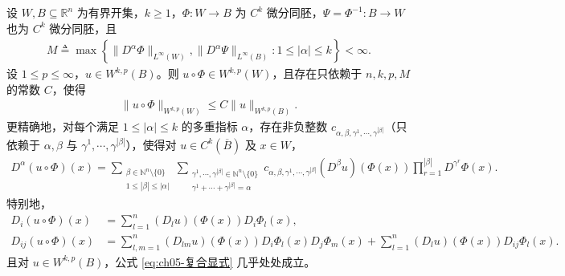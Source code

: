 \documentclass[../../main.tex]{subfiles}
\begin{document}
\begin{proposition}[$C^{k}$微分同胚下的复合函数的弱导数]\label{proposition:ch05-复合Wkp}
设 $W,B\subseteq\mathbb{R}^{n}$ 为有界开集，$k\geqslant1$，$\Phi:W\to B$ 为 $C^{k}$ 微分同胚，$\Psi=\Phi^{-1}:B\to W$ 也为 $C^{k}$ 微分同胚，且
\begin{align*}
M\triangleq\max\left\{\|D^{\alpha}\Phi\|_{L^{\infty}(W)},\|D^{\alpha}\Psi\|_{L^{\infty}(B)}:1\leqslant|\alpha|\leqslant k\right\}<\infty.
\end{align*}
设 $1\leqslant p\leqslant\infty$，$u\in W^{k,p}(B)$。则 $u\circ\Phi\in W^{k,p}(W)$，且存在只依赖于 $n,k,p,M$ 的常数 $C$，使得
\begin{align}
\|u\circ\Phi\|_{W^{k,p}(W)}\leqslant C\|u\|_{W^{k,p}(B)}.
\label{eq:ch05-复合估计}
\end{align}
更精确地，对每个满足 $1\leqslant|\alpha|\leqslant k$ 的多重指标 $\alpha$，存在非负整数 $c_{\alpha,\beta,\gamma^{1},\cdots,\gamma^{|\beta|}}$（只依赖于 $\alpha,\beta$ 与 $\gamma^{1},\cdots,\gamma^{|\beta|}$），使得对 $u\in C^{k}(\overline{B})$ 及 $x\in W$，
\begin{align}
D^{\alpha}(u\circ\Phi)(x)
=\sum_{\substack{\beta\in\mathbb{N}^{n}\setminus\{0\}\\ 1\leqslant|\beta|\leqslant|\alpha|}}
\sum_{\substack{\gamma^{1},\cdots,\gamma^{|\beta|}\in\mathbb{N}^{n}\setminus\{0\}\\ \gamma^{1}+\cdots+\gamma^{|\beta|}=\alpha}}
c_{\alpha,\beta,\gamma^{1},\cdots,\gamma^{|\beta|}}
(D^{\beta}u)(\Phi(x))\prod_{r=1}^{|\beta|}D^{\gamma^{r}}\Phi(x).
\label{eq:ch05-复合显式}
\end{align}
特别地，
\begin{align}
D_i(u\circ\Phi)(x)&=\sum_{l=1}^{n}(D_lu)(\Phi(x))D_i\Phi_l(x),\label{eq:ch05-复合一阶}\\
D_{ij}(u\circ\Phi)(x)&=\sum_{l,m=1}^{n}(D_{lm}u)(\Phi(x))D_i\Phi_l(x)D_j\Phi_m(x)
+\sum_{l=1}^{n}(D_lu)(\Phi(x))D_{ij}\Phi_l(x).\label{eq:ch05-复合二阶}
\end{align}
且对 $u\in W^{k,p}(B)$，公式 \eqref{eq:ch05-复合显式} 几乎处处成立。
\end{proposition}
\end{document}
